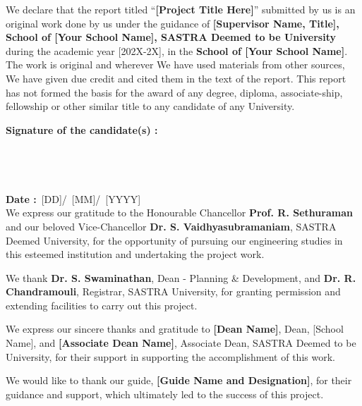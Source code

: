 \documentclass[a4paper, 12pt, oneside]{sastra}
\begin{document}
	\begin{doublespace}
		\linespread{2}
		
		We declare that the report titled ``\textbf{[Project Title Here]}'' submitted by us is an original work done by us under the guidance of \textbf{[Supervisor Name, Title], School of [Your School Name], SASTRA Deemed to be University} during the academic year [202X-2X], in the \textbf{School of [Your School Name]}. The work is original and wherever We have used materials from other sources, We have given due credit and cited them in the text of the report. This report has not formed the basis for the award of any degree, diploma, associate-ship, fellowship or other similar title to any candidate of any University.\\
		
	\end{doublespace}
	\noindent \textbf{Signature of the candidate(s)	:}	
	\\
	\\
	\\
	\\
	\\

	\noindent\textbf{Date\hspace*{43.5mm}					:}~[DD]/~[MM]/~[YYYY]\\%
	
	\acknowledgements
\hspace*{12pt}
We express our gratitude to the Honourable Chancellor \textbf{Prof. R. Sethuraman} and our beloved Vice-Chancellor \textbf{Dr. S. Vaidhyasubramaniam}, SASTRA Deemed University, for the opportunity of pursuing our engineering studies in this esteemed institution and undertaking the project work.

\par We thank \textbf{Dr. S. Swaminathan}, Dean - Planning \& Development, and \textbf{Dr. R. Chandramouli}, Registrar, SASTRA University, for granting permission and extending facilities to carry out this project.

\par We express our sincere thanks and gratitude to \textbf{[Dean Name]}, Dean, [School Name], and \textbf{[Associate Dean Name]}, Associate Dean, SASTRA Deemed to be University, for their support in supporting the accomplishment of this work.

\par We would like to thank our guide, \textbf{[Guide Name and Designation]}, for their guidance and support, which ultimately led to the success of this project.
\end{document}
